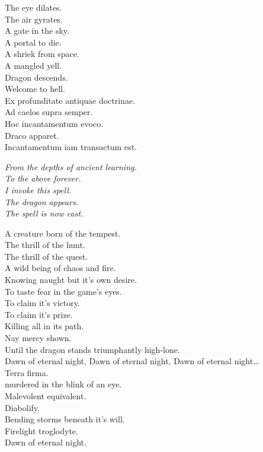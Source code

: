 The eye dilates. \\
The air gyrates. \\
A gate in the sky. \\
A portal to die. \\
A shriek from space. \\
A mangled yell. \\
Dragon descends. \\
Welcome to hell. \\

Ex profunditate antiquae doctrinae. \\
Ad caelos supra semper. \\
Hoc incantamentum evoco. \\
Draco apparet. \\
Incantamentum iam transactum est. \\


{\itshape%
From the depths of ancient learning. \\
To the  above forever. \\
I invoke this spell. \\
The dragon appears. \\
The spell is now cast. \\
}

A creature born of the tempest. \\
The thrill of the hunt. \\
The thrill of the quest. \\
A wild being of chaos and fire. \\
Knowing naught but it's own desire. \\
To taste fear in the game's eyes. \\
To claim it's victory. \\
To claim it's prize. \\
Killing all in its path. \\
Nay mercy shown. \\
Until the dragon stands triumphantly high-lone. \\

Dawn of eternal night, Dawn of eternal night, Dawn of eternal night… \\

Terra firma. \\
 murdered in the blink of an eye. \\
Malevolent equivalent. \\
Diabolify. \\
Bending storms beneath it's will. \\
Firelight troglodyte. \\
Dawn of eternal night. \\

